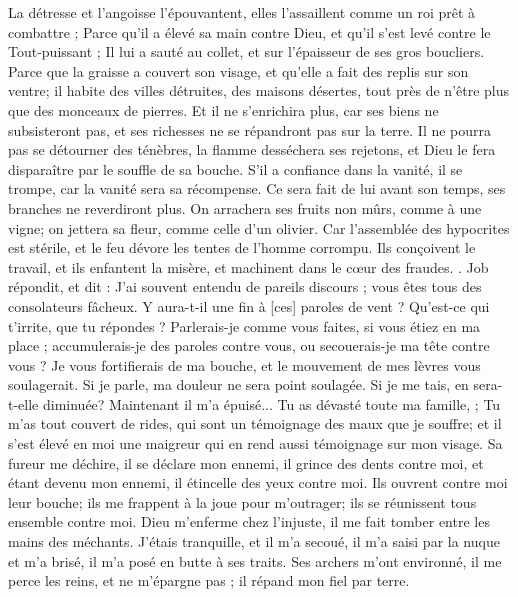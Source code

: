 \begin{multicols}{2}
La détresse et l'angoisse l'épouvantent, elles l'assaillent comme un roi prêt à combattre ;
Parce qu'il a élevé sa main contre Dieu, et qu'il s'est levé contre le Tout-puissant ;
Il lui a sauté au collet, et sur l'épaisseur de ses gros boucliers. 
Parce que la graisse a couvert son visage, et qu'elle a fait des replis sur son ventre;
 il habite des villes détruites, des maisons désertes, tout près de n'être plus que des monceaux de pierres. 
Et il ne s'enrichira plus, car ses biens ne subsisteront pas, et ses richesses ne se répandront pas sur la terre. 
Il ne pourra pas se détourner des ténèbres, la flamme desséchera ses rejetons, et Dieu le fera disparaître par le souffle de sa bouche.
S'il a confiance dans la vanité, il se trompe, car la vanité sera sa récompense.
Ce sera fait de lui avant son temps, ses branches ne reverdiront plus. 
On arrachera ses fruits non mûrs, comme à une vigne; on jettera sa fleur, comme celle d'un olivier. 
Car l'assemblée des hypocrites est stérile, et le feu dévore les tentes de l'homme corrompu.
Ils conçoivent le travail, et ils enfantent la misère, et machinent dans le cœur des fraudes. .
\VerseOne{}Job répondit, et dit :
J'ai souvent entendu de pareils discours ; vous êtes tous des consolateurs fâcheux.
Y aura-t-il une fin à [ces] paroles de vent ? Qu'est-ce qui t'irrite, que tu répondes ?
Parlerais-je comme vous faites, si vous étiez en ma place ; accumulerais-je des paroles contre vous, ou secouerais-je ma tête contre vous ? 
Je vous fortifierais de ma bouche, et le mouvement de mes lèvres vous soulagerait.
Si je parle, ma douleur ne sera point soulagée. Si je me tais, en sera-t-elle diminuée?
Maintenant il m'a épuisé... Tu as dévasté toute ma famille, ;
Tu m'as tout couvert de rides, qui sont un témoignage des maux que je souffre; et il s'est élevé en moi une maigreur qui en rend aussi témoignage sur mon visage. 
Sa fureur me déchire, il se déclare mon ennemi, il grince des dents contre moi, et étant devenu mon ennemi, il étincelle des yeux contre moi.
Ils ouvrent contre moi leur bouche; ils me frappent à la joue pour m'outrager; ils se réunissent tous ensemble contre moi. 
Dieu m'enferme chez l'injuste, il me fait tomber entre les mains des méchants. 
J'étais tranquille, et il m'a secoué, il m'a saisi par la nuque et m'a brisé, il m'a posé en butte à ses traits.
Ses archers m'ont environné, il me perce les reins, et ne m'épargne pas ; il répand mon fiel par terre. 

\end{multicols}
